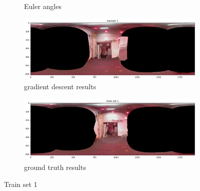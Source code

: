 \documentclass[conference]{IEEEtran}
\begin{document}
\begin{figure}[h]
\begin{subfigure}{0.4\textwidth}
        \caption{Euler angles}
        \label{fig:1ea}
    \end{subfigure}
    \begin{subfigure}{0.4\textwidth}
        \includegraphics[width=\linewidth]{../img/pano_1_gd.png}
        \caption{gradient descent results}
        \label{fig:1p}
    \end{subfigure}
    \begin{subfigure}{0.4\textwidth}
        \includegraphics[width=\linewidth]{../img/pano_1_gt.png}
        \caption{ground truth results}
        \label{fig:1pt}
    \end{subfigure}

    \caption{Train set 1}
    \label{fig:set1}
\end{figure}
\end{document}

